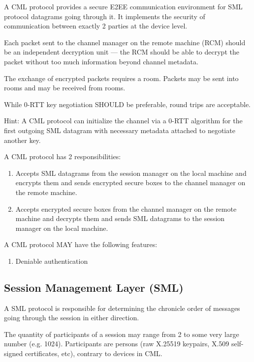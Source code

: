 \documentclass[a4paper,11pt]{article}
\begin{document}
A CML protocol provides a secure E2EE communication environment for SML protocol datagrams going through it.
It implements the security of communication between exactly 2 parties at the device level.

Each packet sent to the channel manager on the remote machine (RCM) should be an independent decryption unit ---
the RCM should be able to decrypt the packet without too much information beyond channel metadata.

The exchange of encrypted packets requires a room.
Packets may be sent into rooms and may be received from rooms.

While 0-RTT key negotiation SHOULD be preferable, round trips are acceptable.

Hint: A CML protocol can initialize the channel via a 0-RTT algorithm for the first outgoing SML datagram
with necessary metadata attached to negotiate another key.

A CML protocol has 2 responsibilities:

\begin{enumerate}
	\item Accepts SML datagrams from the session manager on the local machine
	      and encrypts them and sends encrypted secure boxes to the channel manager on the remote machine.
	\item Accepts encrypted secure boxes from the channel manager on the remote machine
	      and decrypts them and sends SML datagrams to the session manager on the local machine.
\end{enumerate}

A CML protocol MAY have the following features:

\begin{enumerate}
    \item Deniable authentication
\end{enumerate}

\subsection{Session Management Layer (SML)}

A SML protocol is responsible for determining the chronicle order of messages going through the session in either direction.

The quantity of participants of a session may range from 2 to some very large number (e.g. 1024).
Participants are persons (raw X.25519 keypairs, X.509 self-signed certificates, etc),
contrary to devices in CML.
\end{document}
